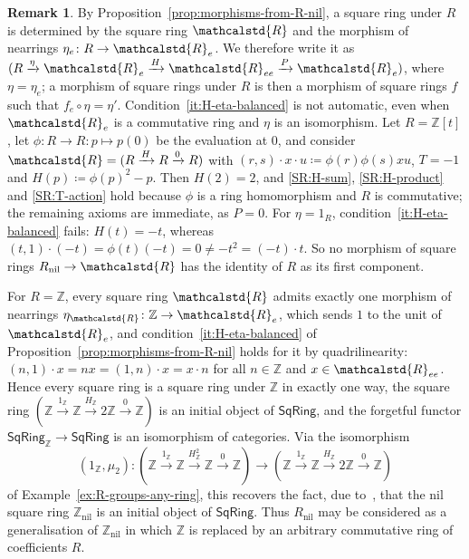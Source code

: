 \documentclass[reqno,a4paper]{amsart}
\theoremstyle{plain}
\theoremstyle{definition}
\newtheorem{remark}[subsection]{Remark}
\newcommand{\DefEq}{\coloneq}
\newcommand{\R}{\ensuremath{\mathcalstd{R}}}
\newcommand{\Z}{\ensuremath{\mathbb{Z}}}
\newcommand{\SqRing}{\ensuremath{\mathsf{SqRing}}}
\DeclareMathOperator{\nil}{nil}
\newcommand{\sqring}[4]{\ensuremath{(#1\xrightarrow{#3}#2\xrightarrow{#4}#1)}}
\renewcommand{\Re}{\ensuremath{\R_{e}}}
\newcommand{\Ree}{\ensuremath{\R_{ee}}}
\begin{document}
\begin{remark}\label{rem:square-ring-under-R}
  By Proposition~\ref{prop:morphisms-from-R-nil}, a square ring under \(R\) is determined by the square ring \(\R\) and the morphism of nearrings \(\eta_{e}\colon R\to\Re\). We therefore write it as \((R\xrightarrow{\eta}\Re\xrightarrow{H}\Ree\xrightarrow{P}\Re)\), where \(\eta=\eta_{e}\); a morphism of square rings under \(R\) is then a morphism of square rings \(f\) such that \(f_{e}\circ\eta=\eta'\). Condition~\ref{it:H-eta-balanced} is not automatic, even when \(\Re\) is a commutative ring and \(\eta\) is an isomorphism. Let \(R=\Z[t]\), let \(\phi\colon R\to R\colon p\mapsto p(0)\) be the evaluation at \(0\), and consider \(\R=\sqring{R}{R}{H}{0}\) with \((r,s)\cdot x\cdot u\DefEq\phi(r)\phi(s)xu\), \(T=-1\) and \(H(p)\DefEq\phi(p)^{2}-p\). Then \(H(2)=2\), and \ref{SR:H-sum}, \ref{SR:H-product} and \ref{SR:T-action} hold because \(\phi\) is a ring homomorphism and \(R\) is commutative; the remaining axioms are immediate, as \(P=0\). For \(\eta=1_{R}\), condition~\ref{it:H-eta-balanced} fails: \(H(t)=-t\), whereas \((t,1)\cdot(-t)=\phi(t)(-t)=0\neq-t^{2}=(-t)\cdot t\). So no morphism of square rings \(R_{\nil}\to\R\) has the identity of \(R\) as its first component.
\end{remark}

For \(R=\Z\), every square ring \(\R\) admits exactly one morphism of nearrings \(\eta_{\R}\colon \Z\to\Re\), which sends \(1\) to the unit of \(\Re\), and condition~\ref{it:H-eta-balanced} of Proposition~\ref{prop:morphisms-from-R-nil} holds for it by quadrilinearity: \((n,1)\cdot x=nx=(1,n)\cdot x=x\cdot n\) for all \(n\in\Z\) and \(x\in\Ree\). Hence every square ring is a square ring under \(\Z\) in exactly one way, the square ring \((\Z\xrightarrow{1_{\Z}}\Z\xrightarrow{H_{\Z}}2\Z\xrightarrow{0}\Z)\) is an initial object of \(\SqRing\), and the forgetful functor \(\SqRing_{\Z}\to\SqRing\) is an isomorphism of categories. Via the isomorphism
\[
  (1_{\Z},\mu_{2})\colon (\Z\xrightarrow{1_{\Z}}\Z\xrightarrow{H_{\Z}^{2}}\Z\xrightarrow{0}\Z)\to(\Z\xrightarrow{1_{\Z}}\Z\xrightarrow{H_{\Z}}2\Z\xrightarrow{0}\Z)
\]
of Example~\ref{ex:R-groups-any-ring}, this recovers the fact, due to~\cite{BHP}, that the nil square ring \(\Z_{\nil}\) is an initial object of \(\SqRing\). Thus \(R_{\nil}\) may be considered as a generalisation of \(\Z_{\nil}\) in which \(\Z\) is replaced by an arbitrary commutative ring of coefficients \(R\).
\end{document}
